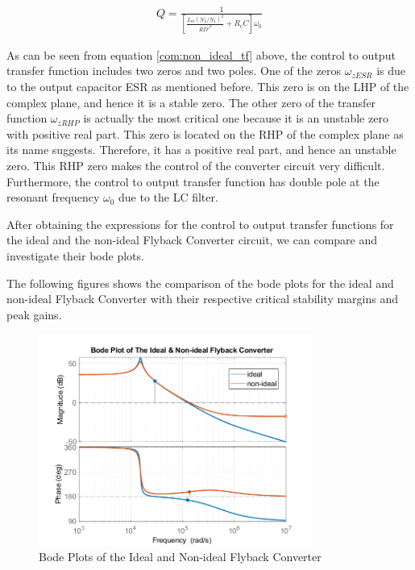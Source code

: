 \begin{align}
    Q = \frac{1}{\left[\frac{L_m(N_2/N_1)^2}{RD'^2} + R_cC \right]\omega_0}
\end{align}

As can be seen from equation \eqref{com:non_ideal_tf} above, the control to output transfer function includes two zeros and two poles. One of the zeros $\omega_{zESR}$ is due to the output capacitor ESR as mentioned before. This zero is on the LHP of the complex plane, and hence it is a stable zero. The other zero of the transfer function $\omega_{zRHP}$ is actually the most critical one because it is an unstable zero with positive real part. This zero is located on the RHP of the complex plane as its name suggests. Therefore, it has a positive real part, and hence an unstable zero. This RHP zero makes the control of the converter circuit very difficult. Furthermore, the control to output transfer function has double pole at the resonant frequency $\omega_0$ due to the LC filter.

After obtaining the expressions for the control to output transfer functions for the ideal and the non-ideal Flyback Converter circuit, we can compare and investigate their bode plots.

The following figures shows the comparison of the bode plots for the ideal and non-ideal Flyback Converter with their respective critical stability margins and peak gains.

\begin{figure}[H]
\begin{center}
\includegraphics[width=0.8\textwidth]{bode_plots/bode2.png}
\caption{Bode Plots of the Ideal and Non-ideal Flyback Converter}
\label{com:bode2}
\end{center}
\end{figure}

